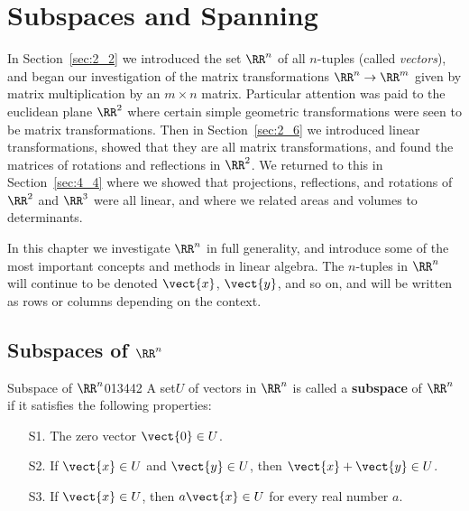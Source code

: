 \section{Subspaces and Spanning}
\label{sec:5_1}

In Section~\ref{sec:2_2} we introduced the set $\RR^n$ of all $n$-tuples (called \textit{vectors}), and began our investigation of the matrix transformations $\RR^n \to \RR^m$ given by matrix multiplication by an $m \times n$ matrix. Particular attention was paid to the euclidean plane $\RR^2$ where certain simple geometric transformations were seen to be matrix transformations. Then in Section~\ref{sec:2_6} we introduced linear transformations, showed that they are all matrix 
transformations, and found the matrices of rotations and reflections in $\RR^2$. We returned to this in Section~\ref{sec:4_4} where we showed that projections, reflections, and rotations of $\RR^2$ and $\RR^3$ were all linear, and where we related areas and volumes to determinants.

In this chapter we investigate $\RR^n$ in full generality, and introduce some of the most important concepts and methods in linear algebra. The $n$-tuples in $\RR^n$ will continue to be denoted $\vect{x}$, $\vect{y}$, and so on, and will be written as rows or columns depending on the context.

\subsection*{Subspaces of $\RR^n$ }

\begin{definition}{Subspace of $\RR^n$}{013442}
A set\footnotemark $U$ of vectors in $\RR^n$ is called a \textbf{subspace} of $\RR^n$ if it satisfies the following properties:

\begin{itemize}
\item[S1.] The zero vector $\vect{0} \in U$.

\item[S2.] If $\vect{x} \in U$ and $\vect{y} \in U$, then $\vect{x} + \vect{y} \in U$.

\item[S3.] If $\vect{x} \in U$, then $a\vect{x} \in U$ for every real number $a$.

\end{itemize}
\end{definition}

